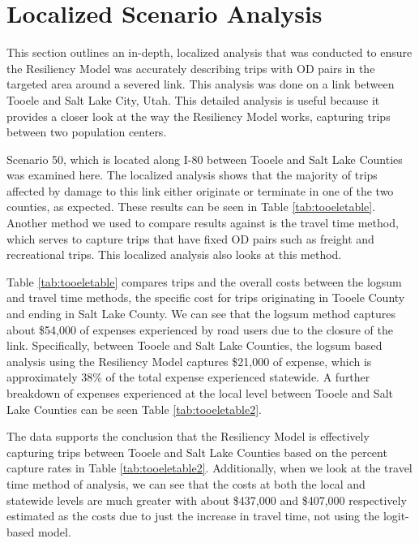 \section{Localized Scenario Analysis}

This section outlines an in-depth, localized analysis that was conducted to ensure
the Resiliency Model was accurately describing trips with OD pairs in the
targeted area around a severed link. This analysis was done on a link between
Tooele and Salt Lake City, Utah. This detailed analysis is useful because it
provides a closer look at the way the Resiliency Model works, capturing trips
between two population centers.

Scenario 50, which is located along I-80 between Tooele and Salt Lake Counties
was examined here. The localized analysis shows that the majority of trips
affected by damage to this link either originate or terminate in one of the
two counties, as expected. These results can be seen in Table
\ref{tab:tooeletable}. Another method we used to compare results against is
the travel time method,
which serves to capture trips that have fixed OD pairs such as freight and
recreational trips. This localized analysis also looks at this method.

Table \ref{tab:tooeletable} compares trips and the overall costs between the
logsum and travel time methods, the specific cost for trips originating in
Tooele County and ending in Salt Lake County. We can see that the logsum
method captures about
\$54,000 of expenses experienced by road users due to the closure of the
link. Specifically, between Tooele and Salt Lake Counties, the logsum based analysis using the Resiliency
Model captures \$21,000 of
expense, which is approximately 38\% of the total expense experienced
statewide. A further breakdown of expenses experienced at the local level
between Tooele and Salt Lake Counties
can be seen Table \ref{tab:tooeletable2}.

The data supports the conclusion that the Resiliency Model is effectively
capturing trips between Tooele and Salt Lake Counties based on the percent capture
rates in Table \ref{tab:tooeletable2}. Additionally, when we look at the
travel time method of analysis, we can see that the costs at both the local and
statewide levels are much greater with about \$437,000 and \$407,000
respectively estimated as the costs due to just the increase in travel time, not using
the logit-based model.

